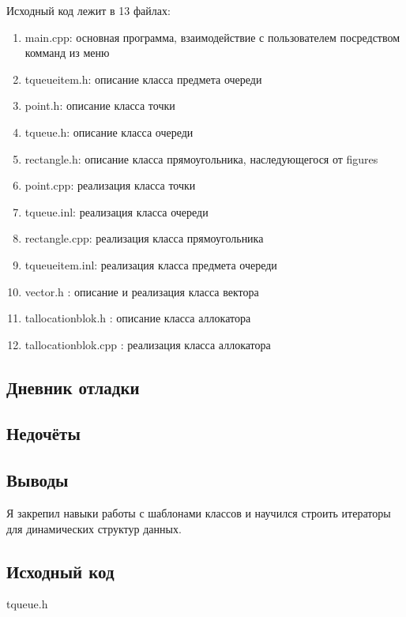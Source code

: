 \documentclass[12pt]{article}
\begin{document}
Исходный код лежит в 13 файлах:
\begin{enumerate}
\item main.cpp: основная программа, взаимодействие с пользователем посредством комманд из меню

\item tqueueitem.h:    описание класса предмета очереди
\item point.h:     описание класса точки
\item tqueue.h:  описание класса очереди
\item rectangle.h: описание класса прямоугольника, наследующегося от figures
\item point.cpp:     реализация класса точки
\item tqueue.inl:  реализация класса очереди
\item rectangle.cpp: реализация класса прямоугольника
\item tqueueitem.inl:    реализация класса предмета очереди
\item vector.h : описание и реализация класса вектора
\item tallocationblok.h : описание класса аллокатора
\item tallocationblok.cpp : реализация класса аллокатора

\end{enumerate}

\subsection*{Дневник отладки}


\subsection*{Недочёты}


\subsection*{Выводы}

Я закрепил навыки работы с шаблонами классов и научился строить итераторы для динамических структур данных.


\vfill

\subsection*{Исходный код}

{\Huge tqueue.h}
\inputminted{C++}{tqueue.h}
    \pagebreak
\end{document}
